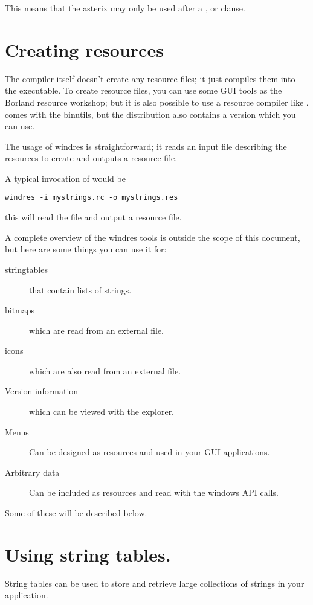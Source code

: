 \begin{remark}This means that the asterix may only be used after a ,
 or  clause.
\end{remark}

\section{Creating resources}

The \fpc compiler itself doesn't create any resource files; it just
compiles them into the executable. To create resource files, you
can use some GUI tools as the Borland resource workshop; but it is
also possible to use a \windows resource compiler like \gnu
{}.  comes with the \gnu binutils, but the
\fpc distribution also contains a version which you can use.

The usage of windres is straightforward; it reads an input file
describing the resources to create and outputs a resource file.

A typical invocation of  would be
\begin{verbatim}
windres -i mystrings.rc -o mystrings.res
\end{verbatim}
this will read the  file and output a
 resource file.

A complete overview of the windres tools is outside the scope of this
document, but here are some things you can use it for:
\begin{description}
\item[stringtables] that contain lists of strings.
\item[bitmaps] which are read from an external file.
\item[icons] which are also read from an external file.
\item[Version information] which can be viewed with the \windows
explorer.
\item[Menus] Can be designed as resources and used in your GUI
applications.
\item[Arbitrary data] Can be included as resources and read with the
windows API calls.
\end{description}

Some of these will be described below.
\section{Using string tables.}
String tables can be used to store and retrieve large collections of
strings in your application.

